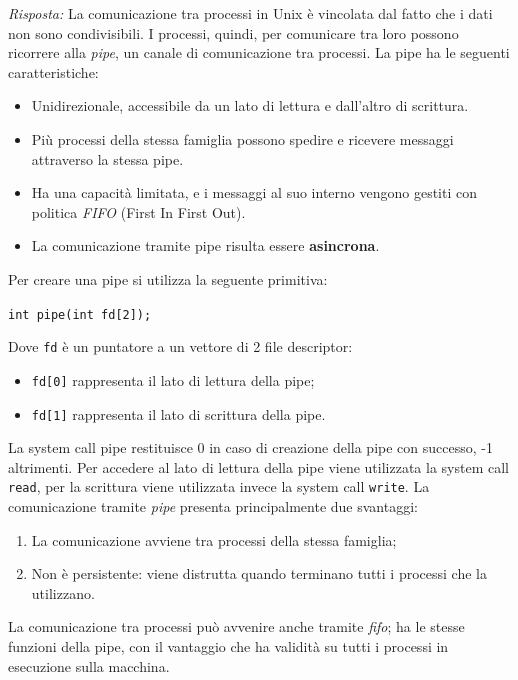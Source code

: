 \documentclass{article}
\newenvironment{solution}
    {\textit{Risposta:}}
    {}
\begin{document}
\begin{solution}
La comunicazione tra processi in Unix è vincolata dal fatto che i dati non sono condivisibili.
\newline
I processi, quindi, per comunicare tra loro possono ricorrere alla \textit{pipe}, un canale di comunicazione tra processi.
La pipe ha le seguenti caratteristiche:
\begin{itemize}
    \item Unidirezionale, accessibile da un lato di lettura e dall’altro di scrittura.
    \item Più processi della stessa famiglia possono spedire e ricevere messaggi attraverso la stessa pipe.
    \item Ha una capacità limitata, e i messaggi al suo interno vengono gestiti con politica \textit{FIFO} (First In First Out).
    \item La comunicazione tramite pipe risulta essere \textbf{asincrona}.
\end{itemize}
Per creare una pipe si utilizza la seguente primitiva:
\begin{center}
\texttt{int pipe(int fd[2]);}  
\end{center}
Dove \texttt{fd} è un puntatore a un vettore di 2 file descriptor:
\begin{itemize}
    \item \texttt{fd[0]} rappresenta il lato di lettura della pipe;
    \item \texttt{fd[1]} rappresenta il lato di scrittura della pipe.
\end{itemize}
La system call pipe restituisce 0 in caso di creazione della pipe con successo, -1 altrimenti.
\newline
Per accedere al lato di lettura della pipe viene utilizzata la system call \texttt{read}, per la scrittura viene utilizzata invece la system call \texttt{write}.
\newline
La comunicazione tramite \textit{pipe} presenta principalmente due svantaggi:
\begin{enumerate}
    \item La comunicazione avviene tra processi della stessa famiglia;
    \item Non è persistente: viene distrutta quando terminano tutti i processi che la utilizzano.
\end{enumerate}
La comunicazione tra processi può avvenire anche tramite \textit{fifo}; ha le stesse funzioni della pipe, con il vantaggio che ha validità su tutti i processi in esecuzione sulla macchina.

\end{solution}
\end{document}
